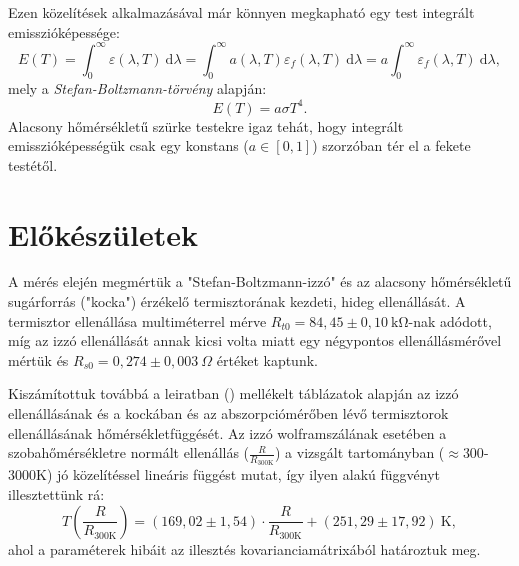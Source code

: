 \documentclass[a4paper, 12pt]{article}
\begin{document}
    Ezen közelítések alkalmazásával már könnyen megkapható egy test integrált emisszióképessége:
    \begin{equation}
        E(T)=\int_{0}^{\infty} \varepsilon(\lambda, T)~\mathrm{d}\lambda=\int_{0}^{\infty} a(\lambda, T)\varepsilon_f(\lambda, T)~\mathrm{d}\lambda=a \int_{0}^{\infty} \varepsilon_f(\lambda, T)~\mathrm{d}\lambda,
    \end{equation}
    mely a \textit{Stefan-Boltzmann-törvény} alapján:
    \begin{equation}
        E(T)=a\sigma T^4.
    \end{equation}
    Alacsony hőmérsékletű szürke testekre igaz tehát, hogy integrált emisszióképességük csak egy konstans ($a\in[0, 1]$) szorzóban tér el a fekete testétől.

    \section{Előkészületek}
    A mérés elején megmértük a "Stefan-Boltzmann-izzó" és az alacsony hőmérsékletű sugárforrás ("kocka") érzékelő termisztorának kezdeti, hideg ellenállását.
    A termisztor ellenállása multiméterrel mérve $R_{t0}=84,45\pm 0,10~\mathrm{k\Omega}$-nak adódott, míg az izzó ellenállását annak kicsi volta miatt egy négypontos ellenállásmérővel mértük és $R_{s0}=0,274\pm 0,003~\Omega$ értéket kaptunk.

    Kiszámítottuk továbbá a leiratban (\cite{leir}) mellékelt táblázatok alapján az izzó ellenállásának és a kockában és az abszorpciómérőben lévő termisztorok ellenállásának hőmérsékletfüggését.
    Az izzó wolframszálának esetében a szobahőmérsékletre normált ellenállás ($\frac{R}{R_{300\mathrm{K}}}$) a vizsgált tartományban ($\approx300$-$3000$K) jó közelítéssel lineáris függést mutat, így ilyen alakú függvényt illesztettünk rá:
    \begin{equation}
        T\left(\frac{R}{R_{300\mathrm{K}}}\right)=(169,02\pm 1,54)\cdot\frac{R}{R_{300\mathrm{K}}}+(251,29\pm17,92)~\mathrm{K},
    \end{equation}
    ahol a paraméterek hibáit az illesztés kovarianciamátrixából határoztuk meg.
\end{document}
